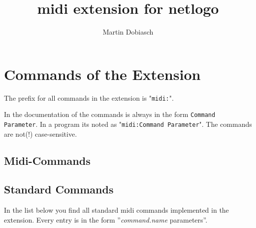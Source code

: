 \documentclass[10pt,a4paper]{article}
\author{Martin Dobiasch}
\title{midi extension for netlogo}
\begin{document}
\section{Commands of the Extension}
The prefix for all commands in the extension is "\lstinline|midi:|". 

In the documentation of the commands is always in the form \lstinline|Command Parameter|.
In a program its noted as "\lstinline|midi:Command Parameter|". The commands
are not(!) case-sensitive. 

\subsection{Midi-Commands}
\subsection{Standard Commands}
In the list below you find all standard midi commands implemented in the extension. 
Every entry is in the form ''\textit{command.name} parameters''.
\end{document}
